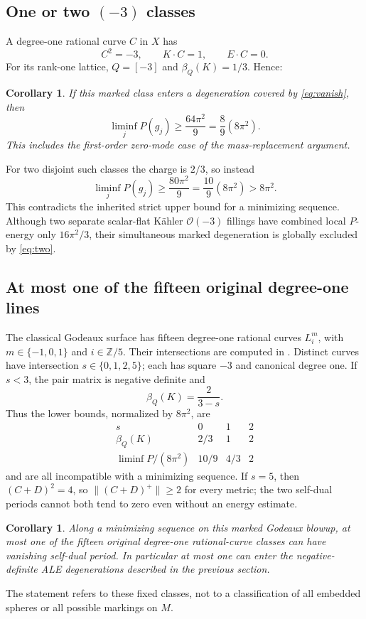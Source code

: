 \documentclass[11pt,a4paper]{article}
\newtheorem{corollary}[theorem]{Corollary}
\theoremstyle{definition}
\theoremstyle{remark}
\begin{document}
\subsection{One or two \texorpdfstring{$(-3)$}{(-3)} classes}
A degree-one rational curve $C$ in $X$ has
\[
 C^2=-3,\qquad K\cdot C=1,\qquad E\cdot C=0.
\]
For its rank-one lattice, $Q=[-3]$ and $\beta_Q(K)=1/3$. Hence:
\begin{corollary}\label{cor:one}
If this marked class enters a degeneration covered by
\eqref{eq:vanish}, then
\begin{equation}\label{eq:one}
 \liminf_jP(g_j)\ge\frac{64\pi^2}{9}
 =\frac89(8\pi^2).
\end{equation}
This includes the first-order zero-mode case of the mass-replacement
argument.
\end{corollary}
For two disjoint such classes the charge is $2/3$, so instead
\begin{equation}\label{eq:two}
 \liminf_jP(g_j)\ge\frac{80\pi^2}{9}
 =\frac{10}{9}(8\pi^2)>8\pi^2.
\end{equation}
This contradicts the inherited strict upper bound for a minimizing
sequence. Although two separate scalar-flat K\"ahler $\mathcal O(-3)$
fillings have combined local $P$-energy only $16\pi^2/3$, their
simultaneous marked degeneration is globally excluded by
\eqref{eq:two}.

\subsection{At most one of the fifteen original degree-one lines}
The classical Godeaux surface has fifteen degree-one rational curves
$L_i^m$, with $m\in\{-1,0,1\}$ and $i\in\mathbb Z/5$. Their intersections
are computed in \cite[Proposition 4.3]{Godeaux}. Distinct curves have
intersection $s\in\{0,1,2,5\}$; each has square $-3$ and canonical
degree one. If $s<3$, the pair matrix is negative definite and
\[
 \beta_Q(K)=\frac2{3-s}.
\]
Thus the lower bounds, normalized by $8\pi^2$, are
\[
\begin{array}{c|ccc}
s&0&1&2\\\hline
\beta_Q(K)&2/3&1&2\\
\displaystyle\liminf P/(8\pi^2)&10/9&4/3&2
\end{array}
\]
and are all incompatible with a minimizing sequence. If $s=5$, then
$(C+D)^2=4$, so $\|(C+D)^+\|\ge2$ for every metric; the two self-dual
periods cannot both tend to zero even without an energy estimate.

\begin{corollary}\label{cor:15}
Along a minimizing sequence on this marked Godeaux blowup, at most one
of the fifteen original degree-one rational-curve classes can have
vanishing self-dual period. In particular at most one can enter the
negative-definite ALE degenerations described in the previous section.
\end{corollary}
The statement refers to these fixed classes, not to a classification of
all embedded spheres or all possible markings on $M$.
\end{document}
